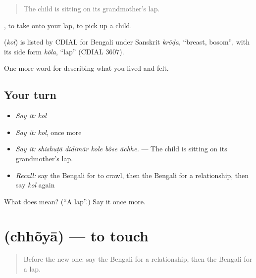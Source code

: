 \begin{quote}
The child is sitting on its grandmother's lap.
\end{quote}

 , to take onto your lap, to pick up a child.

\begin{cousinweb}
\textbf{} (\emph{kol}) is listed by CDIAL for Bengali under Sanskrit \emph{krōḍa}, \textquotedblleft{}breast, bosom\textquotedblright{}, with its side form \emph{kōla}, \textquotedblleft{}lap\textquotedblright{} (CDIAL 3607).
\end{cousinweb}

\begin{grammarlens}[title={What you've built}]
One more word for describing what you lived and felt.
\end{grammarlens}

\subsection*{Your turn}
\begin{itemize}
\raggedright
  \item \emph{Say it:} \emph{kol}
  \item \emph{Say it:} \emph{kol}, once more
  \item \emph{Say it:} \emph{shishuṭā didimār kole bôse āchhe.} — The child is sitting on its grandmother's lap.
  \item \emph{Recall:} say the Bengali for to crawl, then the Bengali for a relationship, then say \emph{kol} again
\end{itemize}

\begin{tcolorbox}[breakable,colback=teal!4,colframe=teal!35!black,title={Before you move on}]
What does  mean? (\textquotedblleft{}A lap\textquotedblright{}.) Say it once more.
\end{tcolorbox}
\section[\texorpdfstring{\bn{ছোঁয়া} (chhõyā)}{ছোঁয়া (chhõyā)}]{ (chhõyā) — to touch}

\label{lesson:BN-C487-chhoya}



\begin{quote}
Before the new one: say the Bengali for a relationship, then the Bengali for a lap.
\end{quote}

